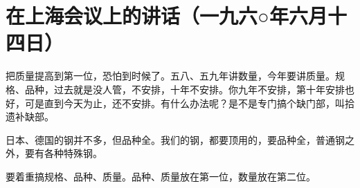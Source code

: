 \section[在上海会议上的讲话（一九六○年六月十四日）]{在上海会议上的讲话（一九六○年六月十四日）}


把质量提高到第一位，恐怕到时候了。五八、五九年讲数量，今年要讲质量。规格、品种，过去就是没人管，不安排，十年不安排。你九年不安排，第十年安排也好，可是直到今天为止，还不安排。有什么办法呢？是不是专门搞个缺门部，叫拾遗补缺部。

日本、德国的钢并不多，但品种全。我们的钢，都要顶用的，要品种全，普通钢之外，要有各种特殊钢。

要着重搞规格、品种、质量。品种、质量放在第一位，数量放在第二位。


